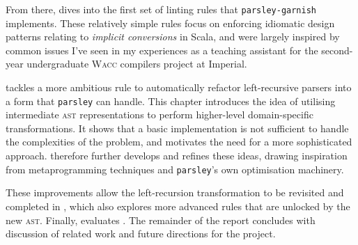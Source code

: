 \documentclass[../../main.tex]{subfiles}
\begin{document}
From there,  dives into the first set of linting rules that \texttt{parsley-garnish} implements.
These relatively simple rules focus on enforcing idiomatic design patterns relating to \emph{implicit conversions} in Scala, and were largely inspired by common issues I've seen in my experiences as a teaching assistant for the second-year undergraduate \textsc{Wacc} compilers project at Imperial.

 tackles a more ambitious rule to automatically refactor left-recursive parsers into a form that \texttt{parsley} can handle.
This chapter introduces the idea of utilising intermediate \textsc{ast} representations to perform higher-level domain-specific transformations.
It shows that a basic implementation is not sufficient to handle the complexities of the problem, and motivates the need for a more sophisticated approach.
 therefore further develops and refines these ideas, drawing inspiration from metaprogramming techniques and \texttt{parsley}'s own optimisation machinery.

These improvements allow the left-recursion transformation to be revisited and completed in , which also explores more advanced rules that are unlocked by the new \textsc{ast}.
Finally,  evaluates .
The remainder of the report concludes with discussion of related work and future directions for the project.
\end{document}
